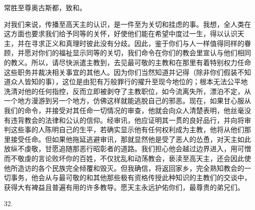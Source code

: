 常胜至尊奥古斯都，致和。\par

对我们来说，传播至高天主的认识，是一件至为关切和挂虑的事。我想，全人类在这方面也要求我们给予同等的关怀，好使他们能在希望中度过一生，得以认识天主，并在寻求正义和真理时彼此没有分歧。因此，鉴于你们与人一样值得同样的眷顾，并愿对你们的福祉显示同等的关切，我们命令在你们的教会里宣认与他们相同的教义。所以，请尽快派遣主教到，去见最可敬的主教和在那里有着特别权力任命这些职务并裁决相关事宜的其他人。因为你们当然知道并记得（除非你们假装不知道众人皆知的事），这位是由犯有万般罪行的擢升至现今地位的；根本无法公平地洗清对他的任何指控，反而立即被剥夺了主教职位，如今流离失所，漂泊不定，从一个地方漫游到另一个地方，仿佛这样就能逃脱自己的邪恶。现在，如果甘心服从我们的命令，并接受对其任命一切情况的审查，他就会向众人清楚表明，他丝毫没有违背教会的法律和公认的信仰。经审讯，他应证明其一贯的良好品行，并向将审判这些事的人陈明自己的生平，若确实显示他有任何权利成为主教，他将从他们那里接受任命。但如果他拖延逃避审讯，那就显然他是受了恶人的怂恿，对天主如此放纵不虔敬，甘愿追随那恶行昭彰者的道路。我们担心他会越过边界进入，用可憎而不敬虔的言论败坏你的百姓，不仅扰乱和动荡教会，亵渎至高天主，还会因此使他所造访的各个民族完全倾覆和毁灭。但我确信，将返回家乡，完全熟知教会的一切事务，他会从与最可敬的和其他那些极有资格传授此种知识的主教们的交谈中，获得大有裨益且普遍有用的许多教导。愿天主永远护佑你们，最尊贵的弟兄们。\par

32. \par


